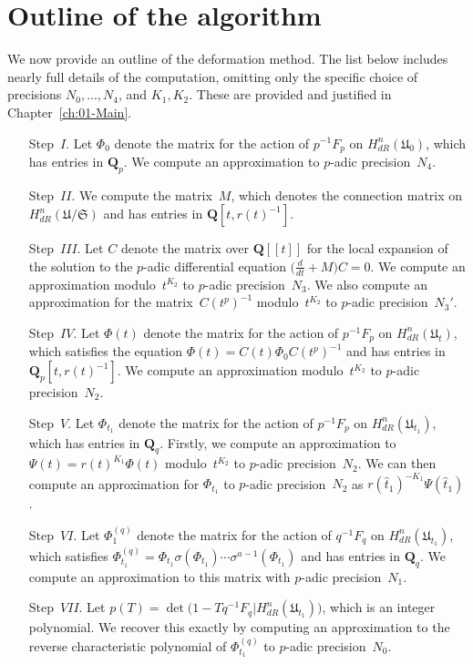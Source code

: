 
\section{Outline of the algorithm}

We now provide an outline of the deformation method.  The list below 
includes nearly full details of the computation, omitting only the 
specific choice of precisions $N_0, \dotsc, N_4$, and $K_1, K_2$.  
These are provided and justified in Chapter~\ref{ch:01-Main}.

\begin{enumerate}
\item[Step~$I$.]
Let $\Phi_0$ denote the matrix for the action of $p^{-1} F_p$ on 
$H_{dR}^{n}(\mathfrak{U}_0)$, which has entries in $\mathbf{Q}_p$.  
We compute an approximation to $p$-adic precision~$N_4$.
\item[Step~$II$.]
We compute the matrix~$M$, which denotes the connection matrix 
on $H_{dR}^{n}(\mathfrak{U}/\mathfrak{S})$ and has entries in 
$\mathbf{Q}[t,r(t)^{-1}]$.
\item[Step~$III$.]
Let $C$ denote the matrix over $\mathbf{Q}[[t]]$ for the local 
expansion of the solution to the $p$-adic differential equation 
$\bigl(\tfrac{d}{dt} + M\bigr) C = 0$.  We compute an approximation 
modulo~$t^{K_2}$ to $p$-adic precision~$N_3$.  We also compute an 
approximation for the matrix~$C(t^p)^{-1}$ modulo~$t^{K_2}$ to $p$-adic 
precision~$N_3'$.
\item[Step~$IV$.]
Let $\Phi(t)$ denote the matrix for the action of $p^{-1} F_p$ on 
$H_{dR}^{n}(\mathfrak{U}_t)$, which satisfies the equation 
$\Phi(t) = C(t) \Phi_0 C(t^p)^{-1}$ and has entries in 
$\mathbf{Q}_p[t,r(t)^{-1}]$.  We compute an approximation modulo~$t^{K_2}$ 
to $p$-adic precision~$N_2$.
\item[Step~$V$.]
Let $\Phi_{t_1}$ denote the matrix for the action of $p^{-1} F_p$ 
on $H_{dR}^{n}(\mathfrak{U}_{t_1})$, which has entries in $\mathbf{Q}_q$. 
Firstly, we compute an approximation to $\Psi(t) = r(t)^{K_1} \Phi(t)$ 
modulo~$t^{K_2}$ to $p$-adic precision~$N_2$.  We can then compute an 
approximation for $\Phi_{t_1}$ to $p$-adic precision~$N_2$ as 
$r(\hat{t}_1)^{-K_1} \Psi(\hat{t}_1)$.
\item[Step~$VI$.]
Let $\Phi_1^{(q)}$ denote the matrix for the action of $q^{-1} F_q$ on 
$H_{dR}^{n}(\mathfrak{U}_{t_1})$, which satisfies 
$\Phi_{t_1}^{(q)} = \Phi_{t_1} \sigma(\Phi_{t_1}) \dotsm \sigma^{a-1}(\Phi_{t_1})$ 
and has entries in $\mathbf{Q}_q$.  We compute an approximation to this 
matrix with $p$-adic precision~$N_1$.
\item[Step~$VII$.]
Let $p(T) = \det\bigl(1 - T q^{-1} F_q | H_{dR}^n(\mathfrak{U}_{t_1})\bigr)$, 
which is an integer polynomial.  We recover this exactly 
by computing an approximation to the reverse characteristic polynomial 
of $\Phi_{t_1}^{(q)}$ to $p$-adic precision~$N_0$.
\end{enumerate}

